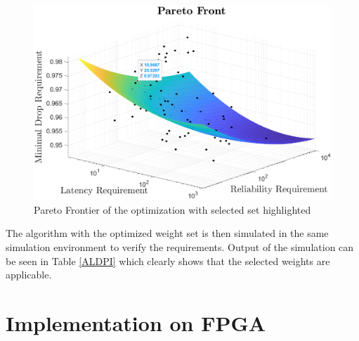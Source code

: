 \documentclass[journal,twoside]{IEEEtran}
\begin{document}
\begin{figure}[ht]
    \centering
    \includegraphics[width=1.1\linewidth]{figures/pareto.eps}
    \captionsetup{justification=centering}
    \caption{Pareto Frontier of the optimization with selected set highlighted}
    \label{fig:pareto}

\end{figure}




\indent The algorithm with the optimized weight set is then simulated in the same simulation environment to verify the requirements. Output of the simulation can be seen in Table \ref{ALDPI} which clearly shows that the selected weights are applicable.

\begin{table}
    \centering
\caption{Simulation Result with The Optimized Weights}
\label{ALDPI}
\end{table}

\vspace{-0.2em}
    
\section{Implementation on FPGA}
\end{document}
